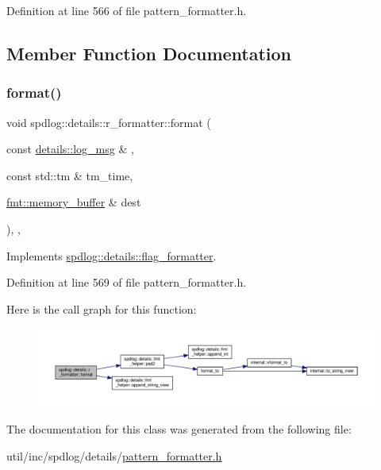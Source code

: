 Definition at line 566 of file pattern\+\_\+formatter.\+h.



\subsection{Member Function Documentation}
\mbox{\label{classspdlog_1_1details_1_1r__formatter_a5d4a5d4f5f1285c4a4af104a775e9859}} 
\subsubsection{\texorpdfstring{format()}{format()}}
{\footnotesize\ttfamily void spdlog\+::details\+::r\+\_\+formatter\+::format (\begin{DoxyParamCaption}\item[{const \hyperlink{structspdlog_1_1details_1_1log__msg}{details\+::log\+\_\+msg} \&}]{,  }\item[{const std\+::tm \&}]{tm\+\_\+time,  }\item[{\hyperlink{format_8h_a21cbf729f69302f578e6db21c5e9e0d2}{fmt\+::memory\+\_\+buffer} \&}]{dest }\end{DoxyParamCaption})\hspace{0.3cm}{\ttfamily [inline]}, {\ttfamily [override]}, {\ttfamily [virtual]}}



Implements \hyperlink{classspdlog_1_1details_1_1flag__formatter_a33fb3e42a4c8200cceb833d92b53fb67}{spdlog\+::details\+::flag\+\_\+formatter}.



Definition at line 569 of file pattern\+\_\+formatter.\+h.

Here is the call graph for this function\+:
\nopagebreak
\begin{figure}[H]
\begin{center}
\leavevmode
\includegraphics[width=350pt]{classspdlog_1_1details_1_1r__formatter_a5d4a5d4f5f1285c4a4af104a775e9859_cgraph}
\end{center}
\end{figure}


The documentation for this class was generated from the following file\+:\begin{DoxyCompactItemize}
\item 
util/inc/spdlog/details/\hyperlink{pattern__formatter_8h}{pattern\+\_\+formatter.\+h}\end{DoxyCompactItemize}
